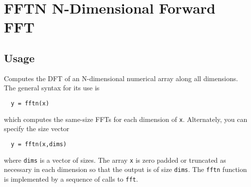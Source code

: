 \section{FFTN N-Dimensional Forward FFT}

\subsection{Usage}

Computes the DFT of an N-dimensional numerical array along all
dimensions.  The general syntax for its use is
\begin{verbatim}
  y = fftn(x)
\end{verbatim}
which computes the same-size FFTs for each dimension of \verb|x|.
Alternately, you can specify the size vector
\begin{verbatim}
  y = fftn(x,dims)
\end{verbatim}
where \verb|dims| is a vector of sizes.  The array \verb|x| is zero padded
or truncated as necessary in each dimension so that the output
is of size \verb|dims|. The \verb|fftn| function is implemented by a sequence
of calls to \verb|fft|.
